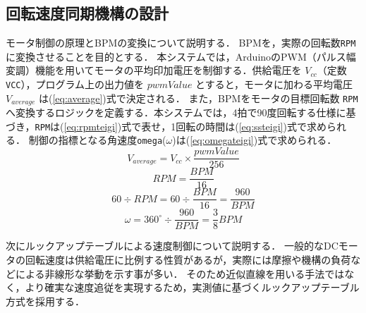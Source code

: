 \documentclass[lualatex,book,paper=a4paper,jafontsize=11.5pt,jafontscale=1.05]{jlreq}
\begin{document}
\subsection{回転速度同期機構の設計}
モータ制御の原理とBPMの変換について説明する．
BPMを，実際の回転数\texttt{RPM}に変換させることを目的とする．
本システムでは，ArduinoのPWM（パルス幅変調）機能を用いてモータの平均印加電圧を制御する．供給電圧を $V_{cc}$（定数 \texttt{VCC}），プログラム上の出力値を $pwmValue$ とすると，モータに加わる平均電圧 $V_{average}$ は(\ref{eq:average})式で決定される．
また，BPMをモータの目標回転数 \texttt{RPM} へ変換するロジックを定義する．本システムでは，4拍で90度回転する仕様に基づき，\texttt{RPM}は(\ref{eq:rpmteigi})式で表せ，1回転の時間は(\ref{eq:ssteigi})式で求められる．
制御の指標となる角速度\texttt{omega}($\omega$)は(\ref{eq:omegateigi})式で求められる．
\begin{equation}
\label{eq:average}
V_{average} = V_{cc} \times \frac{pwmValue}{256}
\end{equation}
\begin{equation}
\label{eq:rpmteigi}
  RPM = \frac{BPM}{16}
\end{equation}
\begin{equation}
\label{eq:ssteigi}
  60 \div RPM = 60 \div \frac{BPM}{16} = \frac{960}{BPM}
\end{equation}
\begin{equation}
\label{eq:omegateigi}
\omega = 360^\circ \div \frac{960}{BPM} = \frac{3}{8}BPM
\end{equation}

次にルックアップテーブルによる速度制御について説明する．
一般的なDCモータの回転速度は供給電圧に比例する性質があるが\cite{ref:control}，実際には摩擦や機構の負荷などによる非線形な挙動を示す事が多い．
そのため近似直線を用いる手法ではなく，より確実な速度追従を実現するため，実測値に基づくルックアップテーブル方式を採用する．
\end{document}
